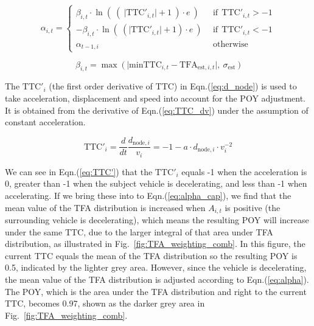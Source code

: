 \begin{equation}
    \alpha_{i,t} = 
    \begin{cases} 
      \beta_{i,t} \cdot \ln \left ( ~ \left( ~ \lvert {\mathrm{TTC}'}_{i,t}  \rvert + 1 ~\right) \cdot e~ \right) &~~\text{if}~~ {\mathrm{TTC}'}_{i,t} > -1\\
      - \beta_{i,t} \cdot \ln \left ( ~ \left( \lvert {\mathrm{TTC}'}_{i,t}  \rvert + 1 \right) \cdot e~ \right) &~~\text{if}~~ {\mathrm{TTC}'}_{i,t} < -1 \\
      \alpha_{t-1,i} &~~\text{otherwise}
    \end{cases}
\label{eq:alpha}
\end{equation}

\begin{equation}
    \beta_{i,t} = 
     \max ~ \big( ~ \lvert {\mathrm{min TTC}}_{i,t} - \mathrm{TFA}_{\mathrm{est}, i,t} \rvert, ~ \sigma_{\mathrm{est}} ~ \big)
\label{eq:beta}
\end{equation}

The ${\mathrm{TTC}'}_{i}$ (the first order derivative of TTC) in Eqn.(\ref{eq:d_node}) is used to take acceleration, displacement and speed into account for the POY adjustment. It is obtained from the derivative of Eqn.(\ref{eq:TTC_dv}) under the assumption of constant acceleration.

\begin{equation}
\mathrm{TTC}'_{i} = \frac{d}{dt}\frac{d_{\mathrm{node},i}}{v_{i}} = -1 -a \cdot d_{\mathrm{node},i} \cdot v_{i}^{-2}
\label{eq:TTC'}
\end{equation}

We can see in Eqn.(\ref{eq:TTC'}) that the $\mathrm{TTC}'_i$ equals -1 when the acceleration is 0, greater than -1 when the subject vehicle is decelerating, and less than -1 when accelerating. If we bring these into to Eqn.(\ref{eq:alpha_cap}), we find that the mean value of the TFA distribution is increased when $A_{i, t}$ is positive (the surrounding vehicle is decelerating), which means the resulting POY will increase under the same TTC, due to the larger integral of that area under TFA distribution, as illustrated in Fig.~\ref{fig:TFA_weighting_comb}. In this figure, the current TTC equals the mean of the TFA distribution so the resulting POY is 0.5, indicated by the lighter grey area. However, since the vehicle is decelerating, the mean value of the TFA distribution is adjusted according to Eqn.(\ref{eq:alpha}). The POY, which is the area under the TFA distribution and right to the current TTC, becomes 0.97, shown as the darker grey area in Fig.~\ref{fig:TFA_weighting_comb}.

